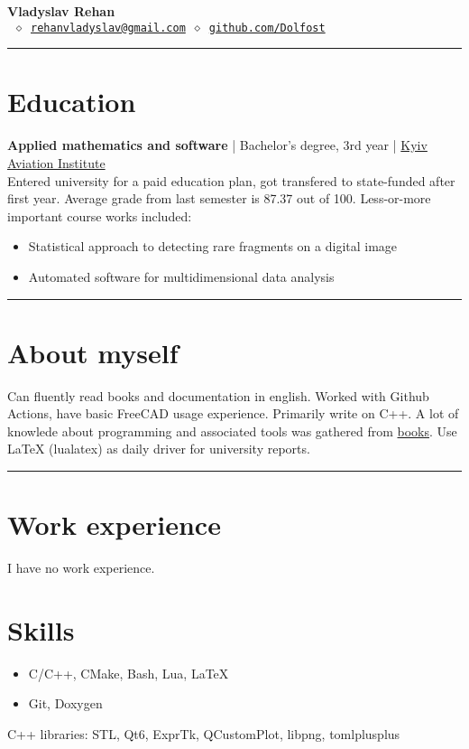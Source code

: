 


\newcommand{\crule}{\par\noindent\rule{\textwidth}{0.5pt}}


\thispagestyle{empty}

\begin{center}
	\LARGE \textbf{Vladyslav Rehan}\\[4mm] \normalsize
	\texttt{ \(\diamond\)\
	\href{mailto:rehanvladyslav@gmail.com}{rehanvladyslav@gmail.com} \(\diamond\)
	\url{github.com/Dolfost}}
\end{center}
\crule
\section{Education}
\textbf{Applied mathematics and software} | Bachelor's degree, 3rd year | \href{http://nau.edu.ua/en/}{Kyiv Aviation Institute}\\
Entered university for a paid education plan, got transfered to state-funded
after first year. Average grade from last semester is 87.37 out of 100.
Less-or-more important course works included:
\begin{itemize}
	\item Statistical approach to detecting rare fragments on a digital image
	\item Automated software for multidimensional data analysis
\end{itemize}

\crule
\section{About myself}
Can fluently read books and documentation in english. Worked with Github
Actions, have basic FreeCAD usage experience. Primarily write on C++. A lot of
knowlede about programming and associated tools was gathered from
\href{https://github.com/Dolfost/Dolfost/blob/main/README.md#literature--sources}{books}.
Use LaTeX (lualatex) as daily driver for university reports.

\crule
\section{Work experience}
I have no work experience.

\section{Skills}
\begin{itemize}
	\item C/C++, CMake, Bash, Lua, LaTeX
	\item Git, Doxygen
\end{itemize}
C++ libraries: STL, Qt6, ExprTk, QCustomPlot, libpng, tomlplusplus

